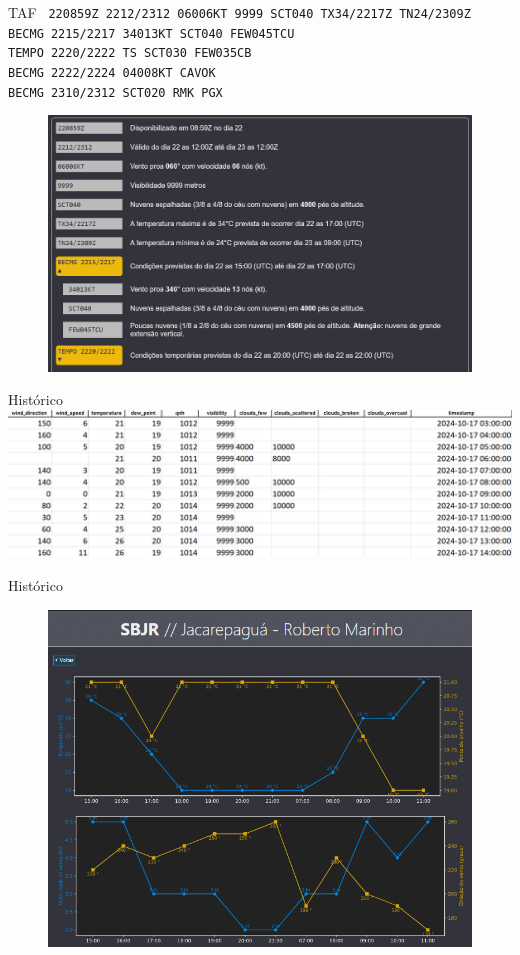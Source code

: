 \documentclass{beamer}
\begin{document}
\begin{frame}{TAF}
    \footnotesize{\texttt{
220859Z 2212/2312 06006KT 9999 SCT040 TX34/2217Z TN24/2309Z \\
    BECMG 2215/2217 34013KT SCT040 FEW045TCU \\
    TEMPO 2220/2222 TS SCT030 FEW035CB \\
    BECMG 2222/2224 04008KT CAVOK \\
    BECMG 2310/2312 SCT020 RMK PGX}}

  \begin{figure}[ht]
    \begin{center}
    \includegraphics[width=0.65\linewidth]{img/TAF-SBBE.png}
    \label{fig:UI}
    \end{center}
    \end{figure}
\end{frame}

\begin{frame}{Histórico}
    \includegraphics[width=0.9\linewidth]{img/image.png}
\end{frame}

\begin{frame}{Histórico}
    \begin{figure}[ht]
        \begin{center}
        \includegraphics[width=0.7\linewidth]{img/history-1.png}
        \label{fig:UI}
        \end{center}
    \end{figure}
\end{frame}
\end{document}
